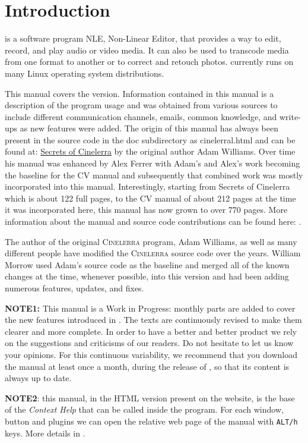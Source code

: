 \chapter*{Introduction}%
\label{cha:introduction}

\CGG{} is a software program NLE, Non-Linear Editor, that provides a
way to edit, record, and play audio or video media.  It can also be
used to transcode media from one format to another or to correct and
retouch photos. \CGG{} currently runs on many Linux operating system
distributions.

This manual covers the \CGG{} \INF{} version.  Information
contained in this manual is a description of the \CGG{} program
usage and was obtained from various sources to include different
communication channels, emails, common knowledge, and write-ups as
new features were added.  The origin of this manual has always been present in the \CGG{} source code in the doc subdirectory as cinelerral.html and can be found at: \href{https://git.cinelerra-gg.org/?p=goodguy/cinelerra.git;a=blob_plain;f=cinelerra-5.1/doc/cinelerra.html;h=f7742b50255d5412af5c4941c5be52bb556d99cd;hb=7fd85fb66168f6b518c5f2d73e04036e87faa0e1} {Secrets of Cinelerra} by the original author Adam Williams.
Over time his manual was enhanced by Alex Ferrer with Adam's and Alex's work becoming the
baseline for the CV manual and subsequently that combined work was mostly incorporated into this manual.
Interestingly, starting from Secrets of Cinelerra which is about 122 full pages, to the CV manual
of about 212 pages at the time it was incorporated here, this manual has now grown to over 770 pages.
More information about the manual and source code contributions can be found here: .

The author of the original
\textsc{Cinelerra} program, Adam Williams, as well as many different
people have modified the \textsc{Cinelerra} source code over the
years.  William Morrow used Adam's source code as the  baseline and merged all of the known changes at the time, whenever
possible, into this \CGG{} version and had been adding numerous
features, updates, and fixes.

{\small \textbf{NOTE1:} This manual is a Work in Progress: monthly parts are added to cover the new features introduced in \CGG{}. The texts are continuously revised to make them clearer and more complete. In order to have a better and better product we rely on the suggestions and criticisms of our readers. Do not hesitate to let us know your opinions. For this continuous variability, we recommend that you download the manual at least once a month, during the release of \CGG{}, so that its content is always up to date.

\textbf{NOTE2}: this manual, in the HTML version present on the website, is the base of the \textit{Context Help} that can be called inside the program. For each window, button and plugins we can open the relative web page of the manual with \texttt{ALT/h} keys. More details in .}

